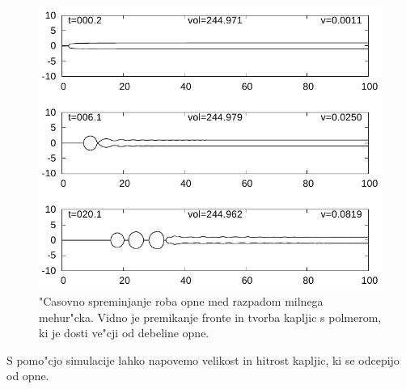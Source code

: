 \documentclass[a4paper,10pt]{article}
\begin{document}
\begin{figure}[h]
  \centering
\includegraphics[width=.8\textwidth]{./Slike/mehurcek-rezultat-1}
\caption{"Casovno spreminjanje roba opne med razpadom milnega mehur"cka. Vidno je premikanje fronte in tvorba kapljic s polmerom, ki je dosti ve"cji od debeline opne. }
\label{fig:mehurcek-rez-1}
\end{figure}

S pomo"cjo simulacije lahko napovemo velikost in hitrost kapljic, ki se odcepijo od opne. 
\end{document}
